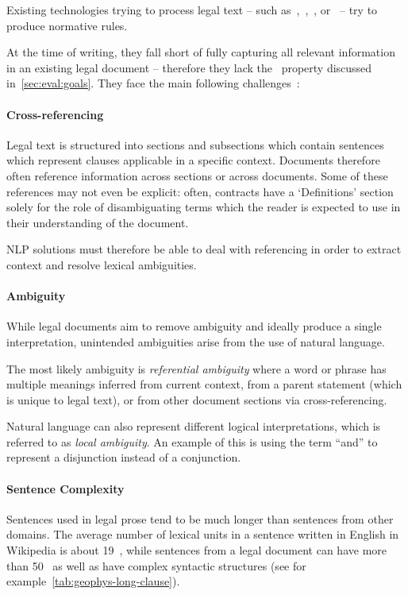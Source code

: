 Existing technologies trying to process legal text -- such as~\cite{angeli2015NLP1},~\cite{lapata2016NLP2},~\cite{lapata2018NLP3}, or~\cite{sleimi2018NLP4} -- try to produce normative rules.

At the time of writing, they fall short of fully capturing all relevant information in an existing legal document -- therefore they lack the~ property discussed in~\autoref{sec:eval:goals}.
They face the main following challenges~\cite{ferraroLegalNLPSSurvey}:

\paragraph{Cross-referencing}

Legal text is structured into sections and subsections which contain sentences which represent clauses applicable in a specific context.
Documents therefore often reference information across sections or across documents.
Some of these references may not even be explicit: often, contracts have a `Definitions' section solely for the role of disambiguating terms which the reader is expected to use in their understanding of the document.

NLP solutions must therefore be able to deal with referencing in order to extract context and resolve lexical ambiguities.

\paragraph{Ambiguity}
While legal documents aim to remove ambiguity and ideally produce a single interpretation, unintended ambiguities arise from the use of natural language.

The most likely ambiguity is \emph{referential ambiguity} where a word or phrase has multiple meanings inferred from current context, from a parent statement (which is unique to legal text), or from other document sections via cross-referencing.

Natural language can also represent different logical interpretations, which is referred to as \emph{local ambiguity}.
An example of this is using the term ``and'' to represent a disjunction instead of a conjunction.

\paragraph{Sentence Complexity}

Sentences used in legal prose tend to be much longer than sentences from other domains.
The average number of lexical units in a sentence written in English in Wikipedia is about 19~\cite{wiki19words}, while sentences from a legal document can have more than 50~\cite{ferraroLegalNLPSSurvey} as well as have complex syntactic structures (see for example~\autoref{tab:geophys-long-clause}).

